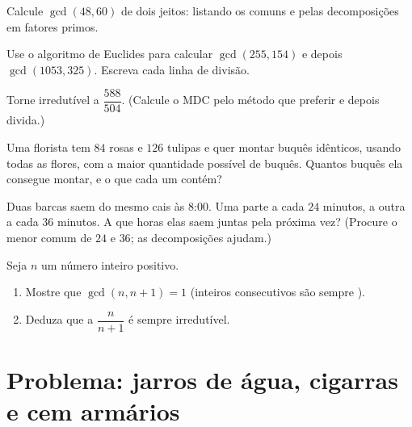 \begin{exercise}[$\star$]\label{exo:g9:arith:5}
Calcule $\gcd(48, 60)$ de dois jeitos: listando os  comuns e
pelas decomposições em fatores primos.
\end{exercise}

\begin{exercise}[$\star\star$]\label{exo:g9:arith:6}
Use o algoritmo de Euclides para calcular $\gcd(255, 154)$ e depois
$\gcd(1053, 325)$. Escreva cada linha de divisão.
\end{exercise}

\begin{exercise}[$\star\star$]\label{exo:g9:arith:7}
Torne irredutível a  $\dfrac{588}{504}$. (Calcule o MDC pelo
método que preferir e depois divida.)
\end{exercise}

\begin{exercise}[$\star\star$]\label{exo:g9:arith:8}
Uma florista tem $84$ rosas e $126$ tulipas e quer montar buquês
idênticos, usando todas as flores, com a maior quantidade possível de
buquês. Quantos buquês ela consegue montar, e o que cada um contém?
\end{exercise}

\begin{exercise}[$\star\star$]\label{exo:g9:arith:9}
Duas barcas saem do mesmo cais às 8:00. Uma parte a cada $24$ minutos,
a outra a cada $36$ minutos. A que horas elas saem juntas pela próxima
vez? (Procure o menor  comum de $24$ e $36$; as decomposições
ajudam.)
\end{exercise}

\begin{exercise}[$\star\star\star$]\label{exo:g9:arith:10}
Seja $n$ um número inteiro positivo.
\begin{enumerate}
  \item Mostre que $\gcd(n, n+1) = 1$ (inteiros consecutivos são sempre
        ).
  \item Deduza que a  $\dfrac{n}{n+1}$ é sempre irredutível.
\end{enumerate}
\end{exercise}

\section{Problema: jarros de água, cigarras e cem armários}


